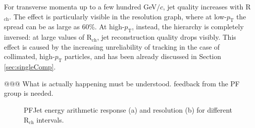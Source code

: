 \documentclass{cmspaper}
\begin{document}
For transverse momenta up to a few hundred GeV$/c$, jet quality increases with R$_{\mathrm{ch}}$. The effect is particularly visible in the resolution graph, where at low-$p_{\mathrm{T}}$ the spread can be as large as 60\%. At high-$p_{\mathrm{T}}$, instead, the hierarchy is completely inversed: at large values of R$_{\mathrm{ch}}$, jet reconstruction quality drops visibly. This effect is caused by the increasing unreliability of tracking in the case of collimated, high-$p_{\mathrm{T}}$ particles, and has been already discussed in Section \ref{sec:singleComp}.

@@@ What is actually happening must be understood. feedback from the PF group is needed. 

\begin{figure}[tb]
\centering
{}
\caption{PFJet energy arithmetic response (a) and resolution (b) for different R$_{\mathrm{ch}}$ intervals.\label{fig:Rch_binning_ARIT}}
\end{figure}
\end{document}
